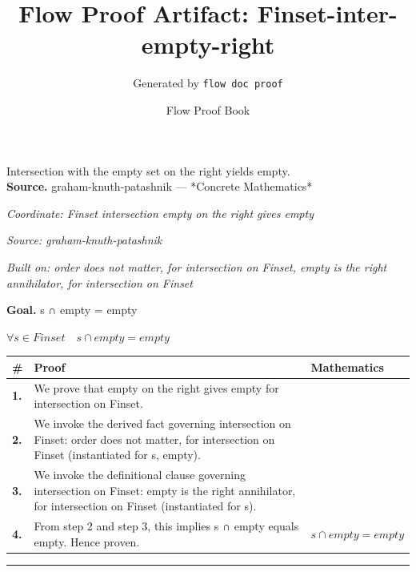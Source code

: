 \documentclass[11pt]{article}
\title{Flow Proof Artifact: Finset-inter-empty-right}
\author{Generated by \texttt{flow doc proof}}
\date{Flow Proof Book}
\theoremstyle{definition}
\begin{document}
\maketitle
Intersection with the empty set on the right yields empty.\\[0.5em]
\textbf{Source.} graham-knuth-patashnik — *Concrete Mathematics*\\[0.5em]
\bigskip
{}\par
\smallskip\noindent\textit{Coordinate: Finset \cdot intersection \cdot empty on the right gives empty}\par
\smallskip\noindent\textit{Source: graham-knuth-patashnik}\par
\smallskip\noindent\textit{Built on: order does not matter, for intersection on Finset, empty is the right annihilator, for intersection on Finset}\par
\medskip
\noindent\textbf{Goal.} s ∩ empty = empty\par
\noindent$\displaystyle \forall s \in Finset\quad s ∩ empty = empty$\par
\medskip
\noindent
\begin{tabular}{@{} >{\raggedright\arraybackslash}p{} >{\raggedright\arraybackslash}p{} >{\raggedleft\arraybackslash}p{} @{}}
\textbf{\#} & \textbf{Proof} & \textbf{Mathematics} \\
\midrule
\textbf{1.} & We prove that empty on the right gives empty for intersection on Finset. & \\[0.45em]
\textbf{2.} & We invoke the derived fact governing intersection on Finset: order does not matter, for intersection on Finset (instantiated for s, empty). & \\[0.45em]
\textbf{3.} & We invoke the definitional clause governing intersection on Finset: empty is the right annihilator, for intersection on Finset (instantiated for s). & \\[0.45em]
\textbf{4.} & From step 2 and step 3, this implies s ∩ empty equals empty. Hence proven. & $\displaystyle s ∩ empty = empty$ \\[0.45em]
\bottomrule
\end{tabular}
\label{thm:Finset-intersection-empty_on_the_right_gives_empty}
\par\medskip\hrule
\end{document}
